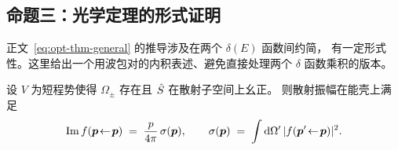 \subsection{命题三：光学定理的形式证明}\label{ssec:cs-optical-formal}

正文~\eqref{eq:opt-thm-general} 的推导涉及在两个 $\delta(E)$ 函数间约简，
有一定形式性。这里给出一个用波包对的内积表述、避免直接处理两个 $\delta$ 函数乘积的版本。

\begin{theorem}[光学定理]\label{thm:cs-optical}
设 $V$ 为短程势使得 $\Omega_\pm$ 存在且 $\hat{S}$ 在散射子空间上幺正。
则散射振幅在能壳上满足
\begin{equation}
\Im f(\bm{p}\!\leftarrow\!\bm{p}) \;=\; \frac{p}{4\pi}\,\sigma(\bm{p}),
\qquad \sigma(\bm{p}) \;=\; \int\mathrm{d}\Omega'\,|f(\bm{p}'\!\leftarrow\!\bm{p})|^2.
\label{eq:cs-optical-restated}
\end{equation}
\end{theorem}

